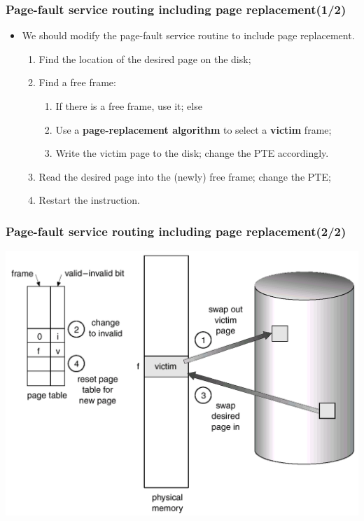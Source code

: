\documentclass[CJKutf8,xcolor=pdftex,dvipsnames,table]{beamer}
\begin{document}
\begin{CJK*}{UTF8}{song}
  \begin{frame}
    \frametitle{Page-fault service routing including page replacement(1/2)} \pause
    \begin{itemize}
    \item{We should modify the page-fault service routine to include page replacement.} \pause
      \begin{enumerate}
      \item{Find the location of the desired page on the disk;} \pause
      \item{Find a free frame: } \pause
        \begin{enumerate}
        \item{If there is a free frame, use it; else} \pause
        \item{Use a \textbf{page-replacement algorithm} to select a \textbf{victim} frame;} \pause
        \item{Write the victim page to the disk; change the PTE accordingly.} \pause
        \end{enumerate}
      \item{Read the desired page into the (newly) free frame; change the PTE;} \pause
      \item{Restart the instruction.}
      \end{enumerate}
    \end{itemize}
  \end{frame}
  
  \begin{frame}
    \frametitle{Page-fault service routing including page replacement(2/2)} \pause
    \begin{center}
      \includegraphics[scale=.3]{v6f10-7}
    \end{center}
  \end{frame}
  

\end{CJK*}
\end{document}
